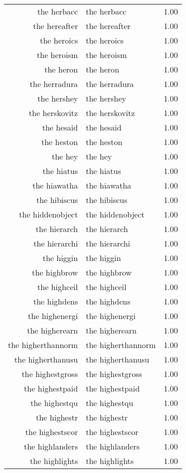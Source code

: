 \begin{table}[ht]
\begin{tabular}{rlr}
  the herbacc & the herbacc & 1.00 \\ 
  the hereafter & the hereafter & 1.00 \\ 
  the heroics & the heroics & 1.00 \\ 
  the heroism & the heroism & 1.00 \\ 
  the heron & the heron & 1.00 \\ 
  the herradura & the herradura & 1.00 \\ 
  the hershey & the hershey & 1.00 \\ 
  the herskovitz & the herskovitz & 1.00 \\ 
  the hesaid & the hesaid & 1.00 \\ 
  the heston & the heston & 1.00 \\ 
  the hey & the hey & 1.00 \\ 
  the hiatus & the hiatus & 1.00 \\ 
  the hiawatha & the hiawatha & 1.00 \\ 
  the hibiscus & the hibiscus & 1.00 \\ 
  the hiddenobject & the hiddenobject & 1.00 \\ 
  the hierarch & the hierarch & 1.00 \\ 
  the hierarchi & the hierarchi & 1.00 \\ 
  the higgin & the higgin & 1.00 \\ 
  the highbrow & the highbrow & 1.00 \\ 
  the highceil & the highceil & 1.00 \\ 
  the highdens & the highdens & 1.00 \\ 
  the highenergi & the highenergi & 1.00 \\ 
  the higherearn & the higherearn & 1.00 \\ 
  the higherthannorm & the higherthannorm & 1.00 \\ 
  the higherthanusu & the higherthanusu & 1.00 \\ 
  the highestgross & the highestgross & 1.00 \\ 
  the highestpaid & the highestpaid & 1.00 \\ 
  the highestqu & the highestqu & 1.00 \\ 
  the highestr & the highestr & 1.00 \\ 
  the highestscor & the highestscor & 1.00 \\ 
  the highlanders & the highlanders & 1.00 \\ 
  the highlights & the highlights & 1.00 \\ 

\end{tabular}
\end{table}
